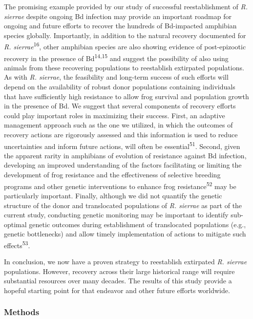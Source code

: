 \documentclass[
  letterpaper,
  DIV=11,
  numbers=noendperiod]{scrartcl}
\begin{document}
The promising example provided by our study of successful
reestablishment of \emph{R. sierrae} despite ongoing Bd infection may
provide an important roadmap for ongoing and future efforts to recover
the hundreds of Bd-impacted amphibian species globally. Importantly, in
addition to the natural recovery documented for \emph{R.
sierrae}\textsuperscript{16}, other amphibian species are also showing
evidence of post-epizootic recovery in the presence of
Bd\textsuperscript{14,15} and suggest the possibility of also using
animals from these recovering populations to reestablish extirpated
populations. As with \emph{R. sierrae}, the feasibility and long-term
success of such efforts will depend on the availability of robust donor
populations containing individuals that have sufficiently high
resistance to allow frog survival and population growth in the presence
of Bd. We suggest that several components of recovery efforts could play
important roles in maximizing their success. First, an adaptive
management approach such as the one we utilized, in which the outcomes
of recovery actions are rigorously assessed and this information is used
to reduce uncertainties and inform future actions, will often be
essential\textsuperscript{51}. Second, given the apparent rarity in
amphibians of evolution of resistance against Bd infection, developing
an improved understanding of the factors facilitating or limiting the
development of frog resistance and the effectiveness of selective
breeding programs and other genetic interventions to enhance frog
resistance\textsuperscript{52} may be particularly important. Finally,
although we did not quantify the genetic structure of the donor and
translocated populations of \emph{R. sierrae} as part of the current
study, conducting genetic monitoring may be important to identify
sub-optimal genetic outcomes during establishment of translocated
populations (e.g., genetic bottlenecks) and allow timely implementation
of actions to mitigate such effects\textsuperscript{53}.

In conclusion, we now have a proven strategy to reestablish extirpated
\emph{R. sierrae} populations. However, recovery across their large
historical range will require substantial resources over many decades.
The results of this study provide a hopeful starting point for that
endeavor and other future efforts worldwide.

\subsubsection{Methods}\label{methods}
\end{document}
